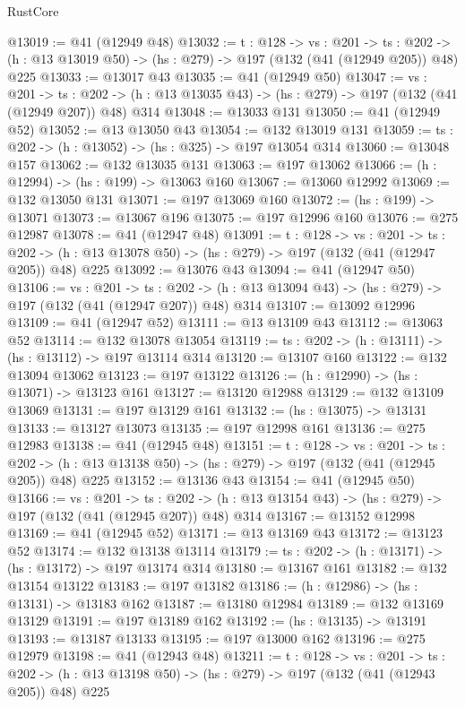 \begin{lexlean}{RustCore}
\begin{coremodule}
@13019 := @41 (@12949 @48)
@13032 := {t : @128} ->
  {vs : @201} ->
  {ts : @202} -> (h : @13 @13019 @50) -> (hs : @279) -> @197 (@132 (@41 (@12949 @205)) @48) @225
@13033 := @13017 @43
@13035 := @41 (@12949 @50)
@13047 := {vs : @201} ->
  {ts : @202} -> (h : @13 @13035 @43) -> (hs : @279) -> @197 (@132 (@41 (@12949 @207)) @48) @314
@13048 := @13033 @131
@13050 := @41 (@12949 @52)
@13052 := @13 @13050 @43
@13054 := @132 @13019 @131
@13059 := {ts : @202} -> (h : @13052) -> (hs : @325) -> @197 @13054 @314
@13060 := @13048 @157
@13062 := @132 @13035 @131
@13063 := @197 @13062
@13066 := (h : @12994) -> (hs : @199) -> @13063 @160
@13067 := @13060 @12992
@13069 := @132 @13050 @131
@13071 := @197 @13069 @160
@13072 := (hs : @199) -> @13071
@13073 := @13067 @196
@13075 := @197 @12996 @160
@13076 := @275 @12987
@13078 := @41 (@12947 @48)
@13091 := {t : @128} ->
  {vs : @201} ->
  {ts : @202} -> (h : @13 @13078 @50) -> (hs : @279) -> @197 (@132 (@41 (@12947 @205)) @48) @225
@13092 := @13076 @43
@13094 := @41 (@12947 @50)
@13106 := {vs : @201} ->
  {ts : @202} -> (h : @13 @13094 @43) -> (hs : @279) -> @197 (@132 (@41 (@12947 @207)) @48) @314
@13107 := @13092 @12996
@13109 := @41 (@12947 @52)
@13111 := @13 @13109 @43
@13112 := @13063 @52
@13114 := @132 @13078 @13054
@13119 := {ts : @202} -> (h : @13111) -> (hs : @13112) -> @197 @13114 @314
@13120 := @13107 @160
@13122 := @132 @13094 @13062
@13123 := @197 @13122
@13126 := (h : @12990) -> (hs : @13071) -> @13123 @161
@13127 := @13120 @12988
@13129 := @132 @13109 @13069
@13131 := @197 @13129 @161
@13132 := (hs : @13075) -> @13131
@13133 := @13127 @13073
@13135 := @197 @12998 @161
@13136 := @275 @12983
@13138 := @41 (@12945 @48)
@13151 := {t : @128} ->
  {vs : @201} ->
  {ts : @202} -> (h : @13 @13138 @50) -> (hs : @279) -> @197 (@132 (@41 (@12945 @205)) @48) @225
@13152 := @13136 @43
@13154 := @41 (@12945 @50)
@13166 := {vs : @201} ->
  {ts : @202} -> (h : @13 @13154 @43) -> (hs : @279) -> @197 (@132 (@41 (@12945 @207)) @48) @314
@13167 := @13152 @12998
@13169 := @41 (@12945 @52)
@13171 := @13 @13169 @43
@13172 := @13123 @52
@13174 := @132 @13138 @13114
@13179 := {ts : @202} -> (h : @13171) -> (hs : @13172) -> @197 @13174 @314
@13180 := @13167 @161
@13182 := @132 @13154 @13122
@13183 := @197 @13182
@13186 := (h : @12986) -> (hs : @13131) -> @13183 @162
@13187 := @13180 @12984
@13189 := @132 @13169 @13129
@13191 := @197 @13189 @162
@13192 := (hs : @13135) -> @13191
@13193 := @13187 @13133
@13195 := @197 @13000 @162
@13196 := @275 @12979
@13198 := @41 (@12943 @48)
@13211 := {t : @128} ->
  {vs : @201} ->
  {ts : @202} -> (h : @13 @13198 @50) -> (hs : @279) -> @197 (@132 (@41 (@12943 @205)) @48) @225

\end{coremodule}
\end{lexlean}
